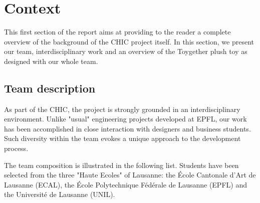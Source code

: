 \newpage
\section{Context}
This first section of the report aims at providing to the reader a complete overview of the background of the CHIC project itself. In this section, we present our team, interdisciplinary work and an overview of the Toygether plush toy as designed with our whole team. 

\subsection{Team description}
As part of the CHIC, the project is strongly grounded in an interdisciplinary environment. Unlike "usual" engineering projects developed at EPFL, our work has been accomplished in close interaction with designers and business students. Such diversity within the team evokes a unique approach to the development process. 

\medskip
The team composition is illustrated in the following list. Students have been selected from the three "Haute Ecoles" of Lausanne: the École Cantonale d'Art de Lausanne (ECAL), the École Polytechnique Fédérale de Lausanne (EPFL) and the Université de Lausanne (UNIL).

